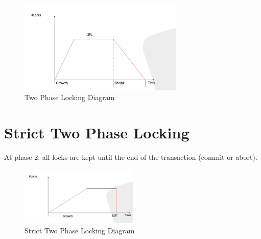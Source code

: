 \documentclass{article}
\begin{document}
\begin{figure}[h]
    \centering
    \includegraphics[width=0.7\textwidth]{assets/two_phase_locking.png}
    \caption{Two Phase Locking Diagram}
\end{figure}

\section*{Strict Two Phase Locking}
At phase 2: all locks are kept until the end of the transaction (commit or abort).

\begin{figure}[h]
    \centering
    \includegraphics[width=0.5\textwidth]{assets/strict_two_phase_locking.png}
    \caption{Strict Two Phase Locking Diagram}
\end{figure}
\end{document}
